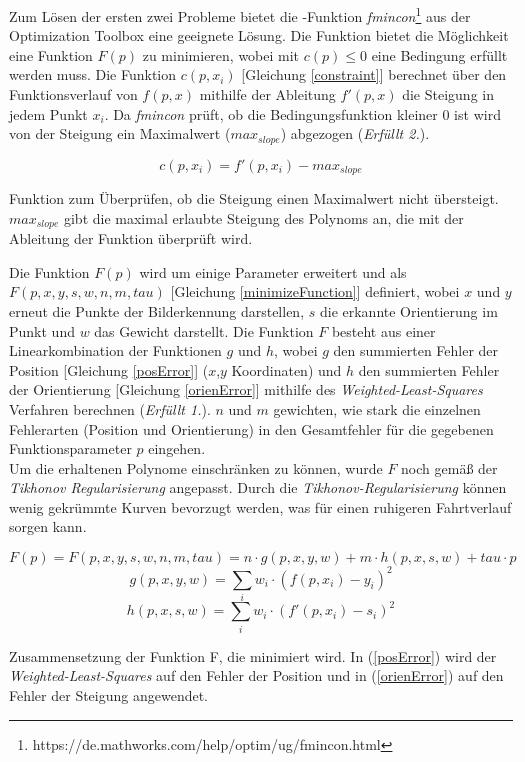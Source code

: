 Zum Lösen der ersten zwei Probleme bietet die \matlab -Funktion \textit{fmincon}\footnote{https://de.mathworks.com/help/optim/ug/fmincon.html} aus der Optimization Toolbox eine geeignete Lösung. Die Funktion bietet die Möglichkeit eine Funktion $F(p)$ zu minimieren, wobei mit $c(p) \leq 0$ eine Bedingung erfüllt werden muss. Die Funktion $c(p,x_i)$ [Gleichung \ref{constraint}] berechnet über den Funktionsverlauf von $f(p,x)$ mithilfe der Ableitung $f'(p,x)$ die Steigung in jedem Punkt $x_i$. Da \textit{fmincon} prüft, ob die Bedingungsfunktion kleiner 0 ist wird von der Steigung ein Maximalwert ($max_{slope}$) abgezogen (\textit{Erfüllt 2.}).\\
\begin{ownequation}[H]
\begin{equation}
c(p,x_i) = f'(p,x_i)-max_{slope}
\end{equation}
\caption[Funktion zum Überprüfen ob die Steigung einen Maximalwert nicht übersteigt.]{Funktion zum Überprüfen, ob die Steigung einen Maximalwert nicht übersteigt. $max_{slope}$ gibt die maximal erlaubte Steigung des Polynoms an, die mit der Ableitung der Funktion überprüft wird.}
\label{constraint}
\end{ownequation}
Die Funktion $F(p)$ wird um einige Parameter erweitert und als $F(p,x,y,s,w,n,m,tau)$ [Gleichung \ref{minimizeFunction}] definiert, wobei $x$ und $y$ erneut die Punkte der Bilderkennung darstellen, $s$ die erkannte Orientierung im Punkt und $w$ das Gewicht darstellt. Die Funktion $F$ besteht aus einer Linearkombination der Funktionen $g$ und $h$, wobei $g$ den summierten Fehler der Position [Gleichung \ref{posError}] ($x$,$y$ Koordinaten) und $h$ den summierten Fehler der Orientierung [Gleichung \ref{orienError}] mithilfe des \textit{Weighted-Least-Squares} Verfahren berechnen (\textit{Erfüllt 1.}). $n$ und $m$ gewichten, wie stark die einzelnen Fehlerarten (Position und Orientierung) in den Gesamtfehler für die gegebenen Funktionsparameter $p$ eingehen.\\
Um die erhaltenen Polynome einschränken zu können, wurde $F$ noch gemäß der \textit{Tikhonov Regularisierung} \cite{kaipio2006statistical} angepasst. Durch die \textit{Tikhonov-Regularisierung} können wenig gekrümmte Kurven bevorzugt werden, was für einen ruhigeren Fahrtverlauf sorgen kann.
\begin{ownequation}[H]
\begin{equation}
\label{minimizeFunction}
F(p) = F(p,x,y,s,w,n,m,tau) = n \cdot g(p,x,y,w) + m \cdot h(p,x,s,w) + tau \cdot p
\end{equation}
\begin{equation}
\label{posError}
g(p,x,y,w) = \sum_{i} w_i \cdot (f(p,x_i)-y_i)^2
\end{equation}
\begin{equation}
\label{orienError}
h(p,x,s,w) = \sum_{i} w_i \cdot (f'(p,x_i)-s_i)^2
\end{equation}
\caption[Definition der Funktion F, die im Schätzverfahren minimiert wird.]{Zusammensetzung der Funktion F, die minimiert wird. In (\ref{posError}) wird der \textit{Weighted-Least-Squares} auf den Fehler der Position und in (\ref{orienError}) auf den Fehler der Steigung angewendet.}
\label{F-function}
\end{ownequation}
